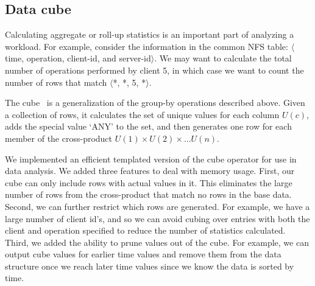 
\subsection{Data cube}

Calculating aggregate or roll-up statistics is an important part of
analyzing a workload.  For example, consider the information in the
common NFS table: $\langle$time, operation, client-id, and
server-id$\rangle$.  We may want to calculate the total number of
operations performed by client 5, in which case we want to count the
number of rows that match $\langle$*, *, 5, *$\rangle$.

The cube~\cite{gray97cube} is a generalization of the group-by
operations described above.  Given a collection of rows, it calculates
the set of unique values for each column $U(c)$, adds the special
value `ANY' to the set, and then generates one row for each member of
the cross-product $U(1) \times U(2) \times ... U(n)$.

We implemented an efficient templated version of the cube operator for
use in data analysis.  We added three features to deal with memory
usage.  First, our cube can only include rows with actual values in
it.  This eliminates the large number of rows from the cross-product
that match no rows in the base data.  Second, we can further restrict
which rows are generated.  For example, we have a large number of
client id's, and so we can avoid cubing over entries with both the client
and operation specified to reduce the number of statistics
calculated.  Third, we added the ability to prune values out of the
cube. For example, we can output cube values for earlier time values
and remove them from the data structure once we reach later time
values since we know the data is sorted by time.

